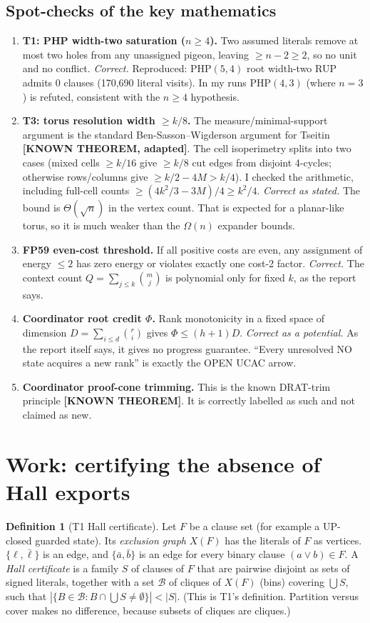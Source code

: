 \documentclass[11pt]{article}
\theoremstyle{definition}
\newtheorem{definition}{Definition}
\theoremstyle{remark}
\newcommand{\lab}[1]{\textbf{[#1]}}
\begin{document}
\subsection{Spot-checks of the key mathematics}\label{sec:spot}
\begin{enumerate}
\item \textbf{T1: PHP width-two saturation ($n\ge4$).} Two assumed literals remove at most two
holes from any unassigned pigeon, leaving $\ge n-2\ge2$, so no unit and no conflict.
\emph{Correct.} Reproduced: PHP$(5,4)$ root width-two RUP admits 0 clauses (170{,}690 literal
visits). In my runs PHP$(4,3)$ (where $n=3$) is refuted, consistent with the $n\ge4$ hypothesis.
\item \textbf{T3: torus resolution width $\ge k/8$.} The measure/minimal-support argument is the
standard Ben-Sasson--Wigderson argument for Tseitin \lab{KNOWN THEOREM, adapted}. The cell
isoperimetry splits into two cases (mixed cells $\ge k/16$ give $\ge k/8$ cut edges from
disjoint 4-cycles; otherwise rows/columns give $\ge k/2-4M>k/4$). I checked the arithmetic,
including full-cell counts $\ge (4k^2/3-3M)/4\ge k^2/4$. \emph{Correct as stated.} The bound is
$\Theta(\sqrt{n})$ in the vertex count. That is expected for a planar-like torus, so it is
much weaker than the $\Omega(n)$ expander bounds.
\item \textbf{FP59 even-cost threshold.} If all positive costs are even, any assignment of energy
$\le2$ has zero energy or violates exactly one cost-2 factor. \emph{Correct.} The context count
$Q=\sum_{j\le k}\binom mj$ is polynomial only for fixed $k$, as the report says.
\item \textbf{Coordinator root credit $\Phi$.} Rank monotonicity in a fixed space of dimension
$D=\sum_{i\le d}\binom ri$ gives $\Phi\le (h+1)D$. \emph{Correct as a potential.} As the report
itself says, it gives no progress guarantee. ``Every unresolved NO state acquires a new rank'' is
exactly the OPEN UCAC arrow.
\item \textbf{Coordinator proof-cone trimming.} This is the known DRAT-trim principle
\lab{KNOWN THEOREM}. It is correctly labelled as such and not claimed as new.
\end{enumerate}

\section{Work: certifying the absence of Hall exports}\label{sec:work}
\begin{definition}[T1 Hall certificate]
Let $F$ be a clause set (for example a UP-closed guarded state). Its \emph{exclusion graph}
$X(F)$ has the literals of $F$ as vertices. $\{\ell,\bar\ell\}$ is an edge, and
$\{\bar a,\bar b\}$ is an edge for every binary clause $(a\vee b)\in F$. A \emph{Hall
certificate} is a family $S$ of clauses of $F$ that are pairwise disjoint as sets of signed
literals, together with a set $\mathcal B$ of cliques of $X(F)$ (bins) covering
$\bigcup S$, such that $|\{B\in\mathcal B: B\cap\bigcup S\neq\emptyset\}|<|S|$. (This is T1's
definition. Partition versus cover makes no difference, because subsets of cliques are cliques.)
\end{definition}
\end{document}
